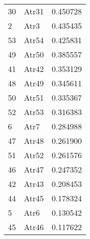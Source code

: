 \begin{tabular}{llr}
30 & Atr31 & 0.450728 \\
2 & Atr3 & 0.435435 \\
53 & Atr54 & 0.425831 \\
49 & Atr50 & 0.385557 \\
41 & Atr42 & 0.353129 \\
48 & Atr49 & 0.345611 \\
50 & Atr51 & 0.335367 \\
52 & Atr53 & 0.316383 \\
6 & Atr7 & 0.284988 \\
47 & Atr48 & 0.261900 \\
51 & Atr52 & 0.261576 \\
46 & Atr47 & 0.247352 \\
42 & Atr43 & 0.208453 \\
44 & Atr45 & 0.178324 \\
5 & Atr6 & 0.130542 \\
45 & Atr46 & 0.117622 \\
\bottomrule
\end{tabular}
